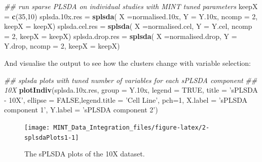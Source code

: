 \documentclass[]{book}
\newenvironment{Shaded}{\begin{snugshade}}{\end{snugshade}}
\newcommand{\CommentTok}[1]{\textcolor[rgb]{0.56,0.35,0.01}{\textit{#1}}}
\newcommand{\DataTypeTok}[1]{\textcolor[rgb]{0.13,0.29,0.53}{#1}}
\newcommand{\DecValTok}[1]{\textcolor[rgb]{0.00,0.00,0.81}{#1}}
\newcommand{\FloatTok}[1]{\textcolor[rgb]{0.00,0.00,0.81}{#1}}
\newcommand{\KeywordTok}[1]{\textcolor[rgb]{0.13,0.29,0.53}{\textbf{#1}}}
\newcommand{\NormalTok}[1]{#1}
\newcommand{\OtherTok}[1]{\textcolor[rgb]{0.56,0.35,0.01}{#1}}
\newcommand{\StringTok}[1]{\textcolor[rgb]{0.31,0.60,0.02}{#1}}
\theoremstyle{definition}
\theoremstyle{definition}
\theoremstyle{definition}
\theoremstyle{remark}
\begin{document}
\begin{Shaded}
\begin{Highlighting}[]
\CommentTok{## run sparse PLSDA on individual studies with MINT tuned parameters}
\NormalTok{keepX =}\StringTok{ }\KeywordTok{c}\NormalTok{(}\DecValTok{35}\NormalTok{,}\DecValTok{10}\NormalTok{)}
\NormalTok{splsda}\FloatTok{.10}\NormalTok{x.res =}\StringTok{ }\KeywordTok{splsda}\NormalTok{( }\DataTypeTok{X =}\NormalTok{normalised}\FloatTok{.10}\NormalTok{x, }\DataTypeTok{Y =}\NormalTok{ Y}\FloatTok{.10}\NormalTok{x, }\DataTypeTok{ncomp =} \DecValTok{2}\NormalTok{,  }
                              \DataTypeTok{keepX =}\NormalTok{ keepX)}
\NormalTok{splsda.cel.res =}\StringTok{ }\KeywordTok{splsda}\NormalTok{( }\DataTypeTok{X =}\NormalTok{normalised.cel, }\DataTypeTok{Y =}\NormalTok{ Y.cel, }\DataTypeTok{ncomp =} \DecValTok{2}\NormalTok{,  }
                              \DataTypeTok{keepX =}\NormalTok{ keepX)}
\NormalTok{splsda.drop.res =}\StringTok{ }\KeywordTok{splsda}\NormalTok{( }\DataTypeTok{X =}\NormalTok{normalised.drop, }\DataTypeTok{Y =}\NormalTok{ Y.drop, }\DataTypeTok{ncomp =} \DecValTok{2}\NormalTok{,  }
                              \DataTypeTok{keepX =}\NormalTok{ keepX)}
\end{Highlighting}
\end{Shaded}

And visualise the output to see how the clusters change with variable
selection:

\begin{Shaded}
\begin{Highlighting}[]
\CommentTok{## splsda plots with tuned number of variables for each sPLSDA component}
\CommentTok{## 10X}
\KeywordTok{plotIndiv}\NormalTok{(splsda}\FloatTok{.10}\NormalTok{x.res, }\DataTypeTok{group =}\NormalTok{ Y}\FloatTok{.10}\NormalTok{x,}
          \DataTypeTok{legend  =} \OtherTok{TRUE}\NormalTok{, }\DataTypeTok{title     =} \StringTok{'sPLSDA - 10X'}\NormalTok{,}
          \DataTypeTok{ellipse =} \OtherTok{FALSE}\NormalTok{,}\DataTypeTok{legend.title =} \StringTok{'Cell Line'}\NormalTok{,}
          \DataTypeTok{pch=}\DecValTok{1}\NormalTok{,}
          \DataTypeTok{X.label =} \StringTok{'sPLSDA component 1'}\NormalTok{,}
          \DataTypeTok{Y.label =} \StringTok{'sPLSDA component 2'}\NormalTok{)}
\end{Highlighting}
\end{Shaded}

\begin{figure}[ht]

{\centering \texttt{[image: MINT\_Data\_Integration\_files/figure-latex/2-splsdaPlots1-1]} 

}

\caption{ The sPLSDA plots of the 10X dataset.}\label{fig:2-splsdaPlots1}
\end{figure}
\end{document}
